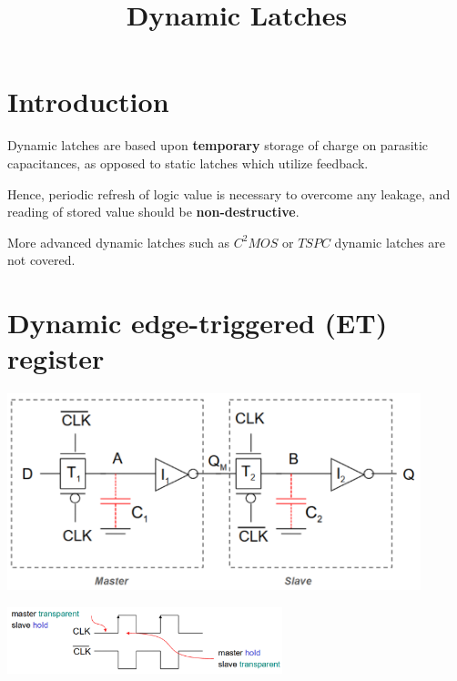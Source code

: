 \documentclass{article}
\title{\vspace{-2cm} Dynamic Latches}
\date{\vspace{-5ex}}
\begin{document}
\maketitle
\section{Introduction}
Dynamic latches are based upon \textbf{temporary} storage of charge on parasitic capacitances,
as opposed to static latches which utilize feedback.

Hence, periodic refresh of logic value is necessary to overcome any leakage, and reading of stored value should be \textbf{non-destructive}.

More advanced dynamic latches such as $C^{2}MOS$ or $TSPC$ dynamic latches are not covered.


\section{Dynamic edge-triggered (ET) register}
\begin{minipage}[c]{0.6\textwidth}
    \vspace{0pt}
    \includegraphics[width=12cm, scale=1]{etRegisterOverview.PNG}
\end{minipage}%
\begin{minipage}[c]{0.5\textwidth}
    \vspace{0pt}
    \includegraphics[width=8cm, scale=1]{timingOverview.PNG}
\end{minipage}
\end{document}
